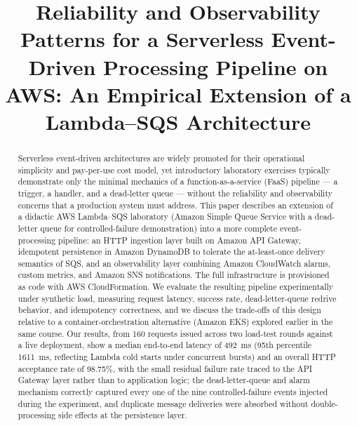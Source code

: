 \documentclass[conference]{IEEEtran}
\begin{document}
\title{Reliability and Observability Patterns for a Serverless Event-Driven Processing Pipeline on AWS: An Empirical Extension of a Lambda--SQS Architecture}

\author{
}

\maketitle

\begin{abstract}
Serverless event-driven architectures are widely promoted for their operational simplicity and pay-per-use cost model, yet introductory laboratory exercises typically demonstrate only the minimal mechanics of a function-as-a-service (FaaS) pipeline --- a trigger, a handler, and a dead-letter queue --- without the reliability and observability concerns that a production system must address. This paper describes an extension of a didactic AWS Lambda--SQS laboratory (Amazon Simple Queue Service with a dead-letter queue for controlled-failure demonstration) into a more complete event-processing pipeline: an HTTP ingestion layer built on Amazon API Gateway, idempotent persistence in Amazon DynamoDB to tolerate the at-least-once delivery semantics of SQS, and an observability layer combining Amazon CloudWatch alarms, custom metrics, and Amazon SNS notifications. The full infrastructure is provisioned as code with AWS CloudFormation. We evaluate the resulting pipeline experimentally under synthetic load, measuring request latency, success rate, dead-letter-queue redrive behavior, and idempotency correctness, and we discuss the trade-offs of this design relative to a container-orchestration alternative (Amazon EKS) explored earlier in the same course. Our results, from 160 requests issued across two load-test rounds against a live deployment, show a median end-to-end latency of 492~ms (95th percentile 1611~ms, reflecting Lambda cold starts under concurrent bursts) and an overall HTTP acceptance rate of 98.75\%, with the small residual failure rate traced to the API Gateway layer rather than to application logic; the dead-letter-queue and alarm mechanism correctly captured every one of the nine controlled-failure events injected during the experiment, and duplicate message deliveries were absorbed without double-processing side effects at the persistence layer.
\end{abstract}
\end{document}
